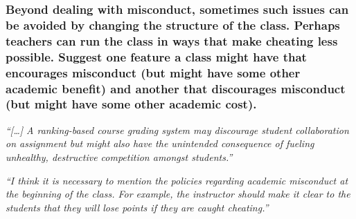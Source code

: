 \documentclass[12pt]{beamer}
\newcommand\ans[1]{{\it ``#1''}}
\begin{document}
\begin{frame}   %

\frametitle{ Beyond dealing with misconduct, sometimes such issues can be avoided by changing the structure of the class. Perhaps teachers can run the class in ways that make cheating less possible.  Suggest one feature a class might have that encourages misconduct (but might have some other academic benefit) and another that discourages misconduct (but might have some other academic cost).}

\ans{[\dots]  A ranking-based course grading system may discourage student collaboration on assignment but might also  have  the  unintended  consequence  of  fueling  unhealthy,  destructive  competition amongst students.}




\ans{I think it is necessary to mention the policies regarding academic misconduct at the beginning of the class.  For example,  the instructor should make it clear to the students  that  they  will  lose  points  if  they  are  caught  cheating.}

\end{frame}
\end{document}
